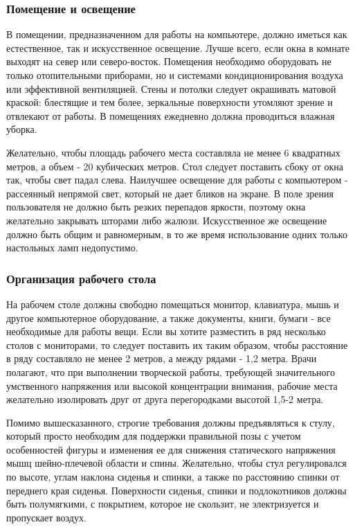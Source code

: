 \documentclass[russian,utf8,emptystyle]{eskdtext}
\begin{document}
\begin{spacing}{1.5}
\subsubsection{Помещение и освещение}
В помещении, предназначенном для работы на компьютере, должно иметься как естественное, так и искусственное освещение. Лучше всего, если окна в комнате выходят на север или северо-восток. Помещения необходимо оборудовать не только отопительными приборами, но и системами кондиционирования воздуха или эффективной вентиляцией. Стены и потолки следует окрашивать матовой краской: блестящие и тем более, зеркальные поверхности утомляют зрение и отвлекают от работы. В помещениях ежедневно должна проводиться влажная уборка.

Желательно, чтобы площадь рабочего места составляла не менее 6 квадратных метров, а объем - 20 кубических метров. Стол следует поставить сбоку от окна так, чтобы свет падал слева. Наилучшее освещение для работы с компьютером - рассеянный непрямой свет, который не дает бликов на экране. В поле зрения пользователя не должно быть резких перепадов яркости, поэтому окна желательно закрывать шторами либо жалюзи. Искусственное же освещение должно быть общим и равномерным, в то же время использование одних только настольных ламп недопустимо.

\subsubsection{Организация рабочего стола}

На рабочем столе должны свободно помещаться монитор, клавиатура, мышь и другое компьютерное оборудование, а также документы, книги, бумаги - все необходимые для работы вещи. Если вы хотите разместить в ряд несколько столов с мониторами, то следует поставить их таким образом, чтобы расстояние в ряду составляло не менее 2 метров, а между рядами - 1,2 метра. Врачи полагают, что при выполнении творческой работы, требующей значительного умственного напряжения или высокой концентрации внимания, рабочие места желательно изолировать друг от друга перегородками высотой 1,5-2 метра.

Помимо вышесказанного, строгие требования должны предъявляться к стулу, который просто необходим для поддержки правильной позы с учетом особенностей фигуры и изменения ее для снижения статического напряжения мышц шейно-плечевой области и спины. Желательно, чтобы стул регулировался по высоте, углам наклона сиденья и спинки, а также по расстоянию спинки от переднего края сиденья. Поверхности сиденья, спинки и подлокотников должны быть полумягкими, с покрытием, которое не скользит, не электризуется и пропускает воздух.


\end{spacing}
\end{document}
